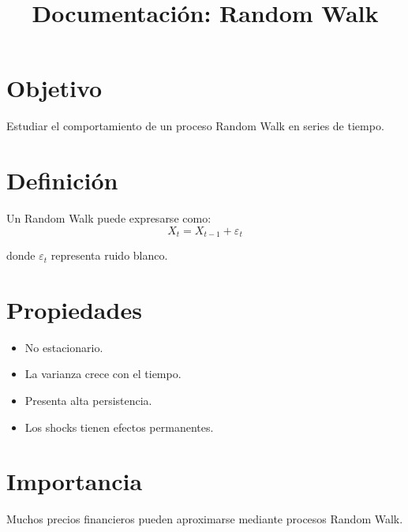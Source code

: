 \documentclass[11pt]{article}
\title{Documentación: Random Walk}
\date{}
\begin{document}
\maketitle

\section{Objetivo}
Estudiar el comportamiento de un proceso Random Walk en series de tiempo.

\section{Definición}
Un Random Walk puede expresarse como:
\[
X_t = X_{t-1} + \varepsilon_t
\]

donde $\varepsilon_t$ representa ruido blanco.

\section{Propiedades}
\begin{itemize}
\item No estacionario.
\item La varianza crece con el tiempo.
\item Presenta alta persistencia.
\item Los shocks tienen efectos permanentes.
\end{itemize}

\section{Importancia}
Muchos precios financieros pueden aproximarse mediante procesos Random Walk.
\end{document}
